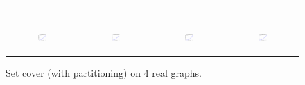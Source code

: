 \begin{figure}[ht]
\begin{tabular}{cccc}
\begin{subfigure}[b]{0.22\textwidth}
			\caption{}
			\label{appfig:partition:diffFA_CF2G_it2004_setcover}
	  \end{subfigure} \\
	  \begin{subfigure}[b]{0.22\textwidth}
	  	\includegraphics[width=110pt]{images_partition/validated_CC2G_friendster_setcover.eps}
			\caption{}
			\label{appfig:partition:validated_CC2G_friendster_setcover}
	  \end{subfigure} &
	  \begin{subfigure}[b]{0.22\textwidth}
	  	\includegraphics[width=110pt]{images_partition/validated_CC2G_arabic2005_setcover.eps}
			\caption{}
			\label{appfig:partition:validated_CC2G_arabic2005_setcover}
	  \end{subfigure} &
	  \begin{subfigure}[b]{0.22\textwidth}
	  	\includegraphics[width=110pt]{images_partition/validated_CC2G_uk2005_setcover.eps}
			\caption{}
			\label{appfig:partition:validated_CC2G_uk2005_setcover}
	  \end{subfigure} &
	  \begin{subfigure}[b]{0.22\textwidth}
	  	\includegraphics[width=110pt]{images_partition/validated_CC2G_it2004_setcover.eps}
			\caption{}
			\label{appfig:partition:validated_CC2G_it2004_setcover}
	  \end{subfigure} \\
  \end{tabular}
  \caption{Set cover (with partitioning) on 4 real graphs.}
\end{figure}



